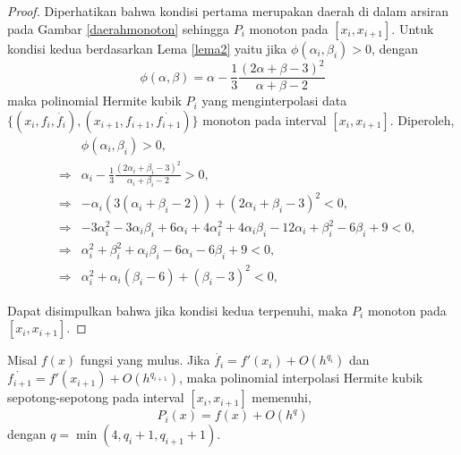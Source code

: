 \begin{proof}
Diperhatikan bahwa kondisi pertama merupakan daerah di dalam arsiran pada Gambar \ref{daerahmonoton} sehingga $P_i$ monoton pada $[x_i, x_{i+1}]$.
Untuk kondisi kedua berdasarkan Lema \ref{lema2} yaitu jika $\phi(\alpha_i, \beta_i) > 0$, dengan
\begin{equation}
    \phi(\alpha,\beta) = \alpha - \frac{1}{3}\frac{(2\alpha + \beta -3)^2}{\alpha + \beta - 2}
\end{equation}
maka polinomial Hermite kubik $P_i$ yang menginterpolasi data $\{(x_i,f_i,\dot{f_i}),(x_{i+1},f_{i+1},\dot{f_{i+1}})\}$ monoton pada interval $[x_i, x_{i+1}]$. Diperoleh,
\begin{align*}
    &&\phi(\alpha_i, \beta_i) > 0, \\
    &\Rightarrow&\alpha_i - \frac{1}{3}\frac{(2\alpha_i + \beta_i -3)^2}{\alpha_i + \beta_i - 2}>0, \\
    &\Rightarrow&-\alpha_i(3(\alpha_i + \beta_i -2)) + (2\alpha_i + \beta_i - 3)^2 < 0, \\
    &\Rightarrow&-3\alpha_i^2 - 3 \alpha_i\beta_i + 6 \alpha_i + 4\alpha_i^2 + 4\alpha_i\beta_i - 12\alpha_i + \beta_i^2 - 6\beta_i + 9 < 0, \\
    &\Rightarrow&\alpha_i^2 + \beta_i^2 + \alpha_i\beta_i - 6\alpha_i -6\beta_i + 9 < 0, \\
    &\Rightarrow&\alpha_i^2 + \alpha_i(\beta_i - 6) + (\beta_i - 3)^2 < 0,
\end{align*}

 Dapat disimpulkan bahwa jika kondisi kedua terpenuhi, maka $P_i$ monoton pada $[x_i, x_{i+1}]$.
\end{proof}
\begin{lemma}\label{orderAkurasi}
    Misal $f(x)$ fungsi yang mulus. Jika $\dot{f_i}=f'(x_i) + O(h^{q_i})$ dan $\dot{f_{i+1}}=f'(x_{i+1}) + O(h^{q_{i+1}})$, maka polinomial interpolasi Hermite kubik sepotong-sepotong pada interval $[x_i,x_{i+1}]$ memenuhi,
    \begin{equation*}
        P_i(x) = f(x) + O(h^q)
    \end{equation*}
    dengan $q=\min(4, q_i+1, q_{i+1}+1)$.
\end{lemma}

